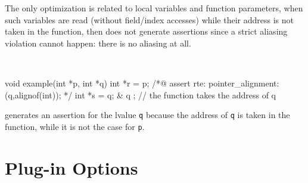 The only optimization is related to local variables and function parameters,
when such variables are read (without field/index accesses) while their address
is not taken in the function, then \rte{} does not generate assertions since a
strict aliasing violation cannot happen: there is no aliasing at all.

\begin{example} ~
\begin{listing-nonumber}
void example(int *p, int *q)
{
  int *r = p;
  /*@ assert rte: pointer_alignment: \aligned(q,alignof(int)); */
  int *s = q;
  & q ; // the function takes the address of q
}
\end{listing-nonumber}
\rte{} generates an assertion for the lvalue \lstinline|q| because the address
of \lstinline|q| is taken in the function, while it is not the case for
\lstinline|p|.
\end{example}

\chapter{Plug-in Options}

